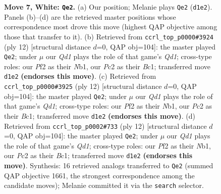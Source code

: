 \documentclass[11pt]{article}
\begin{document}
\begin{figure}[p]
\caption{\textbf{Move 7, White: \texttt{Qe2}.} (a) Our position; Melanie plays \texttt{Qe2} (\texttt{d1e2}). Panels (b)--(d) are the retrieved master positions whose correspondence most drove this move (highest QAP objective among those that transfer to it). (b) Retrieved from \texttt{ccrl\_top\_p0000\#3924} (ply 12) [structural distance $d$=0, QAP obj=104]: the master played \texttt{Qe2}; under $\mu$ our \emph{Qd1} plays the role of that game's \emph{Qd1}; cross-type roles: our \emph{P}f2 as their \emph{N}b1, our \emph{P}c2 as their \emph{B}c1; transferred move \texttt{d1e2} \textbf{(endorses this move)}. (c) Retrieved from \texttt{ccrl\_top\_p0000\#3925} (ply 12) [structural distance $d$=0, QAP obj=104]: the master played \texttt{Qe2}; under $\mu$ our \emph{Qd1} plays the role of that game's \emph{Qd1}; cross-type roles: our \emph{P}f2 as their \emph{N}b1, our \emph{P}c2 as their \emph{B}c1; transferred move \texttt{d1e2} \textbf{(endorses this move)}. (d) Retrieved from \texttt{ccrl\_top\_p0002\#733} (ply 12) [structural distance $d$=0, QAP obj=104]: the master played \texttt{Qe2}; under $\mu$ our \emph{Qd1} plays the role of that game's \emph{Qd1}; cross-type roles: our \emph{P}f2 as their \emph{N}b1, our \emph{P}c2 as their \emph{B}c1; transferred move \texttt{d1e2} \textbf{(endorses this move)}. Synthesis: 16 retrieved analogs transferred to \texttt{Qe2} (summed QAP objective 1661, the strongest correspondence among the candidate moves); Melanie committed it via the \texttt{search} selector.}
\label{fig:thought-m12}
\end{figure}

\clearpage
\end{document}
